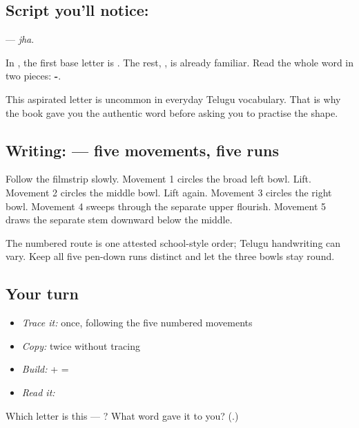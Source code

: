 \subsection*{Script you'll notice: }
\textbf{} — \emph{jha}.

In \textbf{}, the first base letter is \textbf{}. The rest, \textbf{}, is already familiar. Read the whole word in two pieces: \textbf{-}.

This aspirated letter is uncommon in everyday Telugu vocabulary. That is why the book gave you the authentic word \textbf{} before asking you to practise the shape.

\subsection*{Writing:  — five movements, five runs}

Follow the filmstrip slowly. Movement 1 circles the broad left bowl. Lift. Movement 2 circles the middle bowl. Lift again. Movement 3 circles the right bowl. Movement 4 sweeps through the separate upper flourish. Movement 5 draws the separate stem downward below the middle.

The numbered route is one attested school-style order; Telugu handwriting can vary. Keep all five pen-down runs distinct and let the three bowls stay round.

\subsection*{Your turn}
\begin{itemize}
\raggedright
  \item \emph{Trace it:} \textbf{} once, following the five numbered movements
  \item \emph{Copy:} \textbf{} twice without tracing
  \item \emph{Build:} \textbf{} + \textbf{} = \textbf{}
  \item \emph{Read it:} \textbf{}
\end{itemize}

\begin{tcolorbox}[breakable,colback=teal!4,colframe=teal!35!black,title={Before you move on}]
Which letter is this — \textbf{}? What word gave it to you? (\textbf{}.)
\end{tcolorbox}
